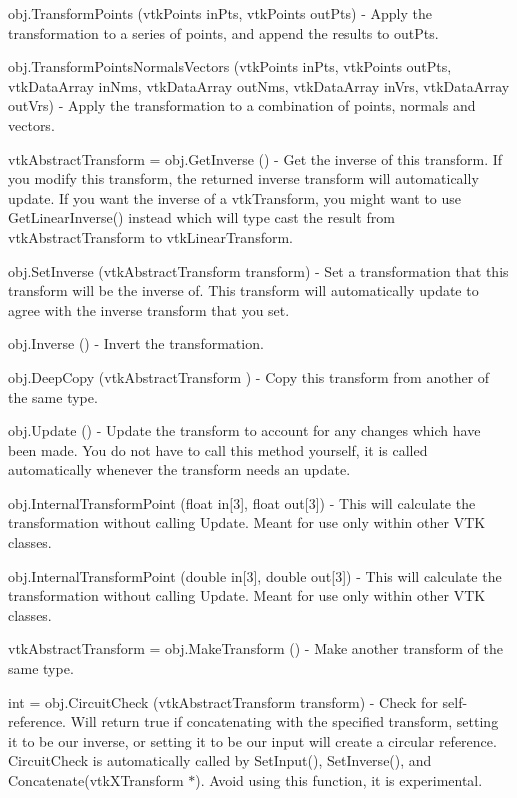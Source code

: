 \begin{DoxyItemize}
\item {\ttfamily obj.\-Transform\-Points (vtk\-Points in\-Pts, vtk\-Points out\-Pts)} -\/ Apply the transformation to a series of points, and append the results to out\-Pts.  
\item {\ttfamily obj.\-Transform\-Points\-Normals\-Vectors (vtk\-Points in\-Pts, vtk\-Points out\-Pts, vtk\-Data\-Array in\-Nms, vtk\-Data\-Array out\-Nms, vtk\-Data\-Array in\-Vrs, vtk\-Data\-Array out\-Vrs)} -\/ Apply the transformation to a combination of points, normals and vectors.  
\item {\ttfamily vtk\-Abstract\-Transform = obj.\-Get\-Inverse ()} -\/ Get the inverse of this transform. If you modify this transform, the returned inverse transform will automatically update. If you want the inverse of a vtk\-Transform, you might want to use Get\-Linear\-Inverse() instead which will type cast the result from vtk\-Abstract\-Transform to vtk\-Linear\-Transform.  
\item {\ttfamily obj.\-Set\-Inverse (vtk\-Abstract\-Transform transform)} -\/ Set a transformation that this transform will be the inverse of. This transform will automatically update to agree with the inverse transform that you set.  
\item {\ttfamily obj.\-Inverse ()} -\/ Invert the transformation.  
\item {\ttfamily obj.\-Deep\-Copy (vtk\-Abstract\-Transform )} -\/ Copy this transform from another of the same type.  
\item {\ttfamily obj.\-Update ()} -\/ Update the transform to account for any changes which have been made. You do not have to call this method yourself, it is called automatically whenever the transform needs an update.  
\item {\ttfamily obj.\-Internal\-Transform\-Point (float in\mbox{[}3\mbox{]}, float out\mbox{[}3\mbox{]})} -\/ This will calculate the transformation without calling Update. Meant for use only within other V\-T\-K classes.  
\item {\ttfamily obj.\-Internal\-Transform\-Point (double in\mbox{[}3\mbox{]}, double out\mbox{[}3\mbox{]})} -\/ This will calculate the transformation without calling Update. Meant for use only within other V\-T\-K classes.  
\item {\ttfamily vtk\-Abstract\-Transform = obj.\-Make\-Transform ()} -\/ Make another transform of the same type.  
\item {\ttfamily int = obj.\-Circuit\-Check (vtk\-Abstract\-Transform transform)} -\/ Check for self-\/reference. Will return true if concatenating with the specified transform, setting it to be our inverse, or setting it to be our input will create a circular reference. Circuit\-Check is automatically called by Set\-Input(), Set\-Inverse(), and Concatenate(vtk\-X\-Transform $\ast$). Avoid using this function, it is experimental.  

\end{DoxyItemize}

